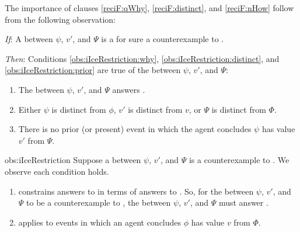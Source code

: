 \begin{note}
  The importance of clauses \ref{reciF:qWhy}, \ref{reciF:distinct}, and \ref{reciF:nHow} follow from the following observation:

    \begin{observation}%
    \label{obs:iIceRestriction}%
    \vspace{-\baselineskip}
    \begin{itenum}
    \item[\emph{If}:]
      A \ros{} between \(\psi\), \(v'\), and \(\Psi\) is a for sure a counterexample to \issueInclusion{}.
    \item[\emph{Then}:]
      Conditions \ref{obs:iIceRestriction:why}, \ref{obs:iIceRestriction:distinct}, and \ref{obs:iIceRestriction:prior} are true of the \ros{} between \(\psi\), \(v'\), and \(\Psi\):
      \begin{enumerate}[label=\arabic*., ref=\arabic*]
      \item
        \label{obs:iIceRestriction:why}
        The \ros{} between \(\psi\), \(v'\), and \(\Psi\) answers \qWhy{}.
      \item
        \label{obs:iIceRestriction:distinct}
        Either \(\psi\) is distinct from \(\phi\), \(v'\) is distinct from \(v\), or \(\Psi\) is distinct from \(\Phi\).
      \item
        \label{obs:iIceRestriction:prior}
        There is no prior (or present) event in which the agent concludes \(\psi\) has value \(v'\) from \(\Psi\).
      \end{enumerate}
    \end{itenum}
    \vspace{-1.5\baselineskip}
  \end{observation}
  \begin{motivation}{obs:iIceRestriction}
    Suppose a \ros{} between \(\psi\), \(v'\), and \(\Psi\) is a counterexample to \issueInclusion{}.
    We observe each condition holds.

    \begin{enumerate}
    \item
      \issueInclusion{} constrains answers to \qWhy{} in terms of answers to \qHow{}.
    So, for the \ros{} between \(\psi\), \(v'\), and \(\Psi\) to be a counterexample to \issueInclusion{}, the \ros{} between \(\psi\), \(v'\), and \(\Psi\) must answer \qWhy{}.
  \item
    \qWhy{} applies to events in which an agent concludes \(\phi\) has value \(v\) from \(\Phi\).


\end{enumerate}
\end{motivation}
\end{note}
